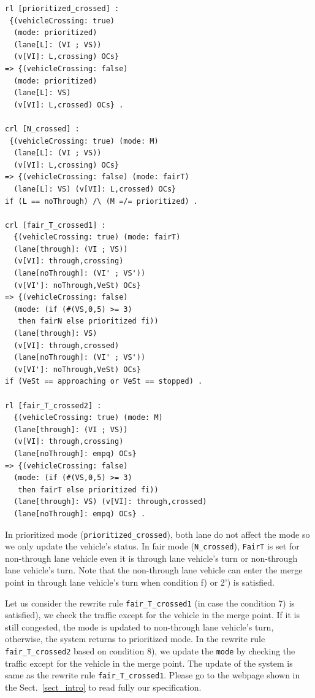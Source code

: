 \documentclass[10pt, conference, compsocconf]{IEEEtran}
\begin{document}
\begin{small}
  \begin{verbatim}
rl [prioritized_crossed] : 
 {(vehicleCrossing: true) 
  (mode: prioritized) 
  (lane[L]: (VI ; VS)) 
  (v[VI]: L,crossing) OCs} 
=> {(vehicleCrossing: false) 
  (mode: prioritized) 
  (lane[L]: VS) 
  (v[VI]: L,crossed) OCs} .

crl [N_crossed] : 
 {(vehicleCrossing: true) (mode: M) 
  (lane[L]: (VI ; VS)) 
  (v[VI]: L,crossing) OCs} 
=> {(vehicleCrossing: false) (mode: fairT) 
  (lane[L]: VS) (v[VI]: L,crossed) OCs} 
if (L == noThrough) /\ (M =/= prioritized) .

crl [fair_T_crossed1] : 
  {(vehicleCrossing: true) (mode: fairT) 
  (lane[through]: (VI ; VS)) 
  (v[VI]: through,crossing) 
  (lane[noThrough]: (VI' ; VS')) 
  (v[VI']: noThrough,VeSt) OCs} 
=> {(vehicleCrossing: false) 
  (mode: (if (#(VS,0,5) >= 3) 
   then fairN else prioritized fi))
  (lane[through]: VS) 
  (v[VI]: through,crossed)
  (lane[noThrough]: (VI' ; VS')) 
  (v[VI']: noThrough,VeSt) OCs} 
if (VeSt == approaching or VeSt == stopped) .

rl [fair_T_crossed2] : 
  {(vehicleCrossing: true) (mode: M)
  (lane[through]: (VI ; VS)) 
  (v[VI]: through,crossing) 
  (lane[noThrough]: empq) OCs} 
=> {(vehicleCrossing: false) 
  (mode: (if (#(VS,0,5) >= 3) 
   then fairT else prioritized fi))
  (lane[through]: VS) (v[VI]: through,crossed) 
  (lane[noThrough]: empq) OCs} .    
  \end{verbatim}
\end{small}
 
In prioritized mode (\verb!prioritized_crossed!), both lane do not affect the mode so we only
update the vehicle's status.
In fair mode (\verb!N_crossed!), \verb!FairT! is set for non-through lane vehicle even 
it is through lane vehicle's turn or non-through lane vehicle's turn.
Note that the non-through lane vehicle can enter the merge point in 
through lane vehicle's turn when condition f) or 2') is satisfied.

Let us consider the rewrite rule \verb!fair_T_crossed1! (in case the condition
7) is satisfied), we check the traffic except for the vehicle in the merge point.
If it is still congested, the mode is updated to non-through lane vehicle's turn,
otherwise, the system returns to prioritized mode. In the rewrite rule 
\verb!fair_T_crossed2! based on condition 8), we update the \verb!mode! by checking the 
traffic except for the vehicle in the merge point.
The update of the system is same as the rewrite rule \verb!fair_T_crossed1!.
Please go to the webpage shown in the Sect.~\ref{sect_intro} to read fully our specification.
 
\end{document}
